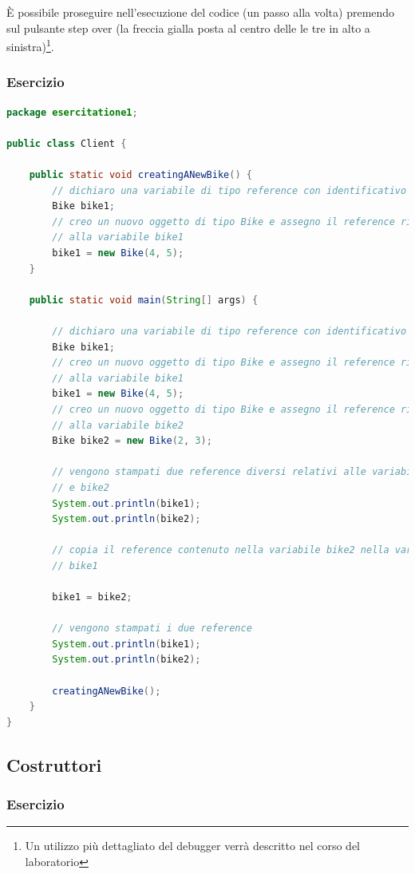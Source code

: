 \documentclass{article}
\theoremstyle{definition}
\begin{document}
\`E possibile proseguire nell'esecuzione del codice (un passo alla volta) premendo sul pulsante step over (la freccia gialla posta al centro delle le tre in alto a sinistra)\footnote{Un utilizzo pi\`u dettagliato del debugger verr\`a descritto nel corso del laboratorio}.

\subsubsection{Esercizio}

\begin{lstlisting}[language=Java,escapechar=|]
package esercitatione1;

public class Client {

	public static void creatingANewBike() {
		// dichiaro una variabile di tipo reference con identificativo bike1
		Bike bike1;
		// creo un nuovo oggetto di tipo Bike e assegno il reference ritornato
		// alla variabile bike1
		bike1 = new Bike(4, 5);
	}

	public static void main(String[] args) {

		// dichiaro una variabile di tipo reference con identificativo bike1
		Bike bike1;
		// creo un nuovo oggetto di tipo Bike e assegno il reference ritornato
		// alla variabile bike1
		bike1 = new Bike(4, 5);
		// creo un nuovo oggetto di tipo Bike e assegno il reference ritornato
		// alla variabile bike2
		Bike bike2 = new Bike(2, 3);

		// vengono stampati due reference diversi relativi alle variabili bike1
		// e bike2
		System.out.println(bike1);
		System.out.println(bike2);

		// copia il reference contenuto nella variabile bike2 nella variabile
		// bike1

		bike1 = bike2;

		// vengono stampati i due reference
		System.out.println(bike1);
		System.out.println(bike2);
		
		creatingANewBike();
    }
}
\end{lstlisting}


\subsection{Costruttori}
\subsubsection{Esercizio}
\end{document}

